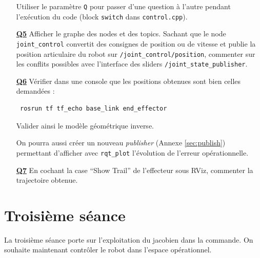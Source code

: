 \documentclass[12pt,a4paper]{article}
\begin{document}
\begin{itemize}
 Utiliser le paramètre \texttt{Q} pour passer d'une question à l'autre pendant l'exécution du code (block \texttt{switch} dans \texttt{control.cpp}).
 
  \medskip\item[\textbf{\underline{Q5}}] Afficher le graphe des nodes et des topics. Sachant que le node \texttt{joint\_control} convertit des consignes de position ou de vitesse et publie la position articulaire du robot sur \texttt{/joint\_control/position}, commenter sur les conflits possibles avec l'interface des sliders \texttt{/joint\_state\_publisher}.
 
 \medskip\item[\textbf{\underline{Q6}}]  Vérifier dans une console que les positions obtenues sont bien celles demandées :
 \begin{verbatim}
 rosrun tf tf_echo base_link end_effector
\end{verbatim}Valider ainsi le modèle géométrique inverse. 

On pourra aussi créer un nouveau \emph{publisher} (Annexe \ref{sec:publish}) permettant d'afficher avec \texttt{rqt\_plot} l'évolution de l'erreur opérationnelle.

\medskip\item[\textbf{\underline{Q7}}] En cochant la case ``Show Trail'' de l'effecteur sous RViz, commenter la trajectoire obtenue.

\end{itemize}

\newpage

\section{Troisième séance}

La troisième séance porte sur l'exploitation du jacobien dans la commande. On souhaite maintenant contrôler le robot dans l'espace opérationnel.
\end{document}
